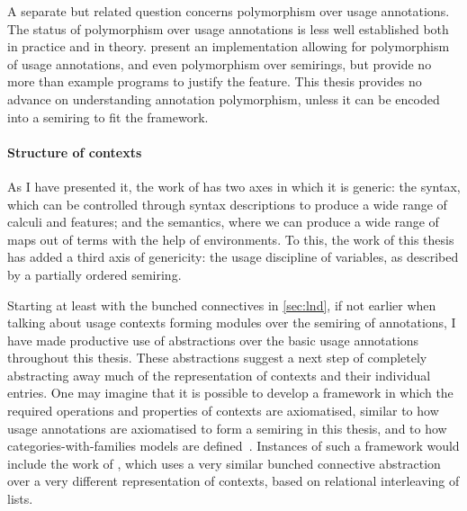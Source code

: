 A separate but related question concerns polymorphism over usage annotations.
The status of polymorphism over usage annotations is less well established both
in practice and in theory.
 present an implementation allowing for polymorphism of usage
annotations, and even polymorphism over semirings, but provide no more than
example programs to justify the feature.
This thesis provides no advance on understanding annotation polymorphism, unless
it can be encoded into a semiring to fit the framework.


\paragraph{Structure of contexts}
As I have presented it, the work of \citet{AACMM21} has two axes in which it is
generic: the syntax, which can be controlled through syntax descriptions to
produce a wide range of calculi and features; and the semantics, where we can
produce a wide range of maps out of terms with the help of environments.
To this, the work of this thesis has added a third axis of genericity: the usage
discipline of variables, as described by a partially ordered semiring.

Starting at least with the bunched connectives in \cref{sec:lnd}, if not earlier
when talking about usage contexts forming modules over the semiring of
annotations, I have made productive use of abstractions over the basic usage
annotations throughout this thesis.
These abstractions suggest a next step of completely abstracting away much of
the representation of contexts and their individual entries.
One may imagine that it is possible to develop a framework in which the required
operations and properties of contexts are axiomatised, similar to how usage
annotations are axiomatised to form a semiring in this thesis, and to how
categories-with-families models are defined~\citep{Dybjer95,CCD19}.
Instances of such a framework would include the work of \citet{RPKV20}, which
uses a very similar bunched connective abstraction over a very different
representation of contexts, based on relational interleaving of lists.

